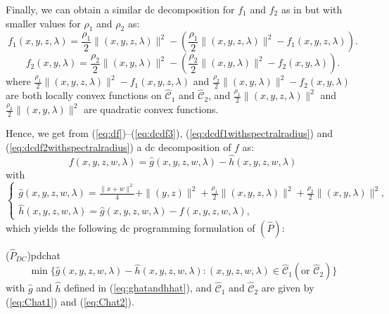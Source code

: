 \documentclass[3p]{elsarticle}
\begin{document}
Finally, we can obtain a similar dc decomposition for $f_1$ and $f_2$ as in \cite{Niu15} but with smaller values for $\rho_1$ and $\rho_2$ as:
\begin{equation}\label{eq:dcdf1withspectralradius}
f_1(x,y,z,\lambda)=\frac{\rho_1}{2} \|(x,y,z,\lambda)\|^2 - \left(\frac{\rho_1}{2} \|(x,y,z,\lambda)\|^2 - f_1(x,y,z,\lambda)\right).
\end{equation}
\begin{equation}\label{eq:dcdf2withspectralradius}
f_2(x,y,\lambda)=\frac{\rho_2}{2} \|(x,y,\lambda)\|^2 - \left(\frac{\rho_2}{2} \|(x,y,\lambda)\|^2 - f_2(x,y,\lambda)\right).
\end{equation}
where $ \frac{\rho_1}{2} \|(x,y,z,\lambda)\|^2 - f_1(x,y,z,\lambda)$ and $\frac{\rho_2}{2} \|(x,y,\lambda)\|^2 - f_2(x,y,\lambda)$ are both locally convex functions on $\mathcal{\hat{C}}_1$ and $\mathcal{\hat{C}}_2$, and $\frac{\rho_1}{2} \|(x,y,z,\lambda)\|^2$ and $\frac{\rho_2}{2} \|(x,y,\lambda)\|^2$ are quadratic convex functions.

Hence, we get from  (\ref{eq:df})--(\ref{eq:dcdf3}), (\ref{eq:dcdf1withspectralradius}) and (\ref{eq:dcdf2withspectralradius}) a dc decomposition of $f$ as:
\[f(x,y,z,w,\lambda) = \hat{g}(x,y,z,w,\lambda)-\hat{h}(x,y,z,w,\lambda)\]
with
\begin{equation}\label{eq:ghatandhhat}
\left\lbrace \begin{array}{l}
\hat{g}(x,y,z,w,\lambda) = \frac{\|x+w\|^2}{4} + \|(y,z)\|^2+ \frac{\rho_1}{2} \|(x,y,z,\lambda)\|^2  + \frac{\rho_2}{2} \|(x,y,\lambda)\|^2, \\
\hat{h}(x,y,z,w,\lambda) = \hat{g}(x,y,z,w,\lambda)-f(x,y,z,w,\lambda),
\end{array}\right.
\end{equation}
which yields the following dc programming formulation of $(\hat{P})$:

\begin{Dcp}{($\hat{P}_{DC}$)}{pdchat}
	\begin{equation}\label{prob:pdchat}
	 \min \{\hat{g}(x,y,z,w,\lambda)-\hat{h}(x,y,z,w,\lambda): (x,y,z,w,\lambda)\in \mathcal{\hat{C}}_1 (\text{or } \mathcal{\hat{C}}_2)\}
	\end{equation} 
	with $\hat{g}$ and $\hat{h}$ defined in (\ref{eq:ghatandhhat}), and $\mathcal{\hat{C}}_1$ and $\mathcal{\hat{C}}_2$ are given by (\ref{eq:Chat1}) and (\ref{eq:Chat2}).
\end{Dcp}
\end{document}
